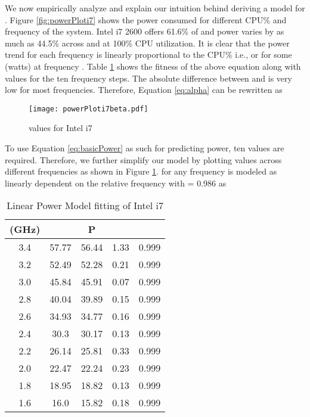 \documentclass{sig-alternate}
\begin{document}
We now empirically analyze and explain our intuition behind deriving a model for . Figure \ref{fig:powerPloti7} shows the power consumed for different CPU\% and frequency of the system. Intel i7 2600 offers 61.6\% of  and power varies by as much as 44.5\% across  and  at 100\% CPU utilization. It is clear that the power trend for each frequency is linearly proportional to the CPU\% i.e.,  or  for some  (watts) at frequency . Table \ref{fittingi7} shows the fitness of the above equation along with  values for the ten frequency steps. The absolute difference between  and  is very low for most frequencies. Therefore, Equation \ref{eq:alpha} can be rewritten as 
\begin{figure}[!htbp]
\begin{center}
 \texttt{[image: powerPloti7beta.pdf]}
\caption{ values for Intel i7}
\label{fig:powerPloti7beta}
\end{center}
\vspace{-0.5cm}
\end{figure}

To use Equation \ref{eq:basicPower} as such for predicting power, ten  values are required. Therefore, we further simplify our model by plotting  values across different frequencies as shown in Figure \ref{fig:powerPloti7beta}.  for any frequency is modeled as linearly dependent on the relative frequency with  = 0.986 as 
\begin{table}[!htbp]
\caption{Linear Power Model fitting of Intel i7}
\begin{center}
\begin{tabular}{|c|c|c|c|c|}
\hline
\textbf{ (GHz)} & \textbf{} & \textbf{P} &  & \textbf{}\\ \hline
3.4 & 57.77 & 56.44 & 1.33 & 0.999\\ \hline
3.2 & 52.49 & 52.28 & 0.21 & 0.999\\ \hline
3.0 & 45.84 & 45.91 & 0.07 & 0.999\\ \hline
2.8 & 40.04 & 39.89 & 0.15 & 0.999\\ \hline
2.6 & 34.93 & 34.77 & 0.16 & 0.999\\ \hline
2.4 & 30.3 & 30.17 & 0.13 & 0.999\\ \hline
2.2 & 26.14 & 25.81 & 0.33 & 0.999\\ \hline
2.0 & 22.47 & 22.24 & 0.23 & 0.999\\ \hline
1.8 & 18.95 & 18.82 & 0.13 & 0.999\\ \hline
1.6 & 16.0 & 15.82 & 0.18 & 0.999\\ \hline
\end{tabular}
\end{center}
\label{fittingi7}
\vspace{-0.5cm}
\end{table}
\end{document}
